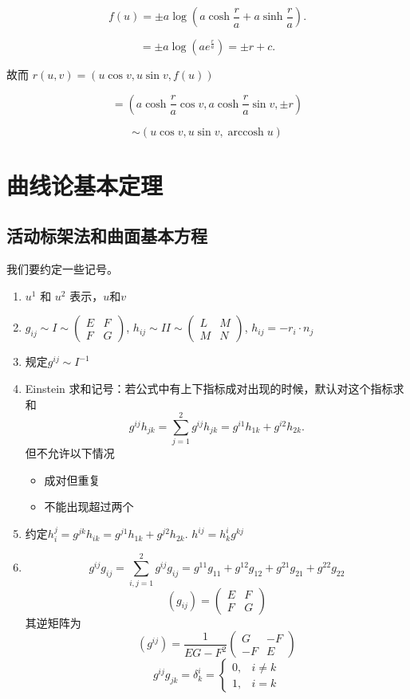\documentclass[lang=cn,10pt,thmcnt=section]{elegantbook}
\begin{document}
\[
f(u) = \pm a \log \left( a \cosh \frac{r}{a} + a \sinh \frac{r}{a} \right).
\]

\[
= \pm a \log \left( a e^{\frac{r}{a}} \right) = \pm r + c.
\]

故而 $r(u, v) = (u \cos v, u \sin v, f(u))$

\[
= \left( a \cosh \frac{r}{a} \cos v, a \cosh \frac{r}{a} \sin v, \pm r \right)
\]

\[
\sim (u \cos v, u \sin v, \operatorname{arccosh} u)
\]
\chapter{曲线论基本定理}
\section{活动标架法和曲面基本方程}
我们要约定一些记号。
\begin{enumerate}
    \item $u^1$ 和 $u^2$ 表示，$u \text{和}v$
    \item $g_{ij} \sim I \sim \begin{pmatrix} E & F \\ F & G \end{pmatrix}$, \quad $h_{ij} \sim II \sim \begin{pmatrix} L & M \\ M & N \end{pmatrix}$, \quad $h_{ij} = -r_i \cdot n_j$
    \item 规定$g^{ij}\sim I^{-1}$
    \item Einstein 求和记号：若公式中有上下指标成对出现的时候，默认对这个指标求和
    \[
    g^{ij}h_{jk}=\sum_{j=1}^{2} g^{ij} h_{jk} = g^{i1} h_{1k} + g^{i2} h_{2k}.
    \]但不允许以下情况
    \begin{itemize}
        \item 成对但重复
        \item 不能出现超过两个
    \end{itemize}
    \item  约定$h_i^j=  g^{jk} h_{ik} = g^{j1} h_{1k} + g^{j2} h_{2k}$. \quad $h^{ij} = h_k^i g^{kj}$
    \item
    \[
    g^{ij} g_{ij} = \sum_{i,j=1}^{2} g^{ij} g_{ij} = g^{11} g_{11} + g^{12} g_{12} + g^{21} g_{21} + g^{22} g_{22}
    \]
    \[
	(g_{ij}) = \begin{pmatrix}
	E & F \\
	F & G
	\end{pmatrix}
	\]
	其逆矩阵为
	\[
	(g^{ij}) = \frac{1}{EG - F^2}
	\begin{pmatrix}
	G & -F \\
	-F & E
	\end{pmatrix}
	\]
    \[
    g^{ij} g_{jk} = \delta_k^i = \begin{cases} 0, & i \neq k \\ 1, & i = k \end{cases}
    \]
\end{enumerate}
\end{document}
